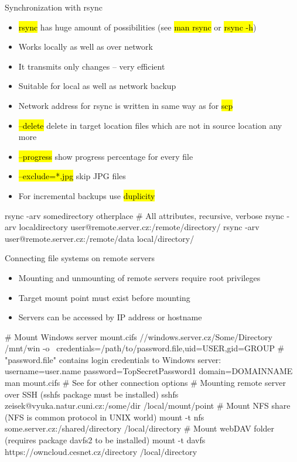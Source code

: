 \documentclass[compress, ucs, xelatex, 11pt, xcolor=svgnames,
  hyperref={
    bookmarks=true,
    unicode=true,
    colorlinks=true,
    pdftitle={Linux, command line and MetaCentrum},
    plainpages=false,
    pdfauthor={Vojtech Zeisek},
    pdfsubject={Course about use of Linux command line, writing shell scripts and using MetaCentrum of CESNET},
    pdfcreator={XeLaTeX},
    pdfkeywords={Linux, GNU, BASH, shell, command line, MetaCentrum},
    linkcolor=Red,
    anchorcolor=Blue,
    citecolor=Purple,
    filecolor=DodgerBlue,
    menucolor=DarkOrchid,
    urlcolor=DeepSkyBlue,
    pdftex},
  url={hyphens, lowtilde} %
  ]{beamer}
\renewcommand{\texttt}[1]{\hl{\ttfamily #1}}
\begin{document}
\begin{frame}[fragile]{Synchronization with rsync}
  \begin{itemize}
    \item \texttt{rsync} has huge amount of possibilities (see \texttt{man rsync} or \texttt{rsync -h})
    \item Works locally as well as over network
    \item It transmits only changes -- very efficient
    \item Suitable for local as well as network backup
    \item Network address for rsync is written in same way as for \texttt{scp}
    \item \texttt{--delete} delete in target location files which are not in source location any more
    \item \texttt{--progress} show progress percentage for every file
    \item \texttt{--exclude=*.jpg} skip JPG files
    \item For incremental backups use \texttt{duplicity}
  \end{itemize}
  \begin{bashcode}
    rsync -arv somedirectory otherplace # All attributes, recursive, verbose
    rsync -arv localdirectory user@remote.server.cz:/remote/directory/
    rsync -arv user@remote.server.cz:/remote/data local/directory/
  \end{bashcode}
\end{frame}

\begin{frame}[fragile]{Connecting file systems on remote servers}
  \begin{itemize}
    \item Mounting and unmounting of remote servers require root privileges
    \item Target mount point must exist before mounting
    \item Servers can be accessed by IP address or hostname
  \end{itemize}
  \begin{bashcode}
    # Mount Windows server
    mount.cifs //windows.server.cz/Some/Directory /mnt/win -o \
      credentials=/path/to/password.file,uid=USER,gid=GROUP
    # "password.file" contains login credentials to Windows server:
    username=user.name
    password=TopSecretPassword1
    domain=DOMAINNAME
    man mount.cifs # See for other connection options
    # Mounting remote server over SSH (sshfs package must be installed)
    sshfs zeisek@vyuka.natur.cuni.cz:/some/dir /local/mount/point
    # Mount NFS share (NFS is common protocol in UNIX world)
    mount -t nfs some.server.cz:/shared/directory /local/directory
    # Mount webDAV folder (requires package davfs2 to be installed)
    mount -t davfs https://owncloud.cesnet.cz/directory /local/directory
  \end{bashcode}
\end{frame}
\end{document}
